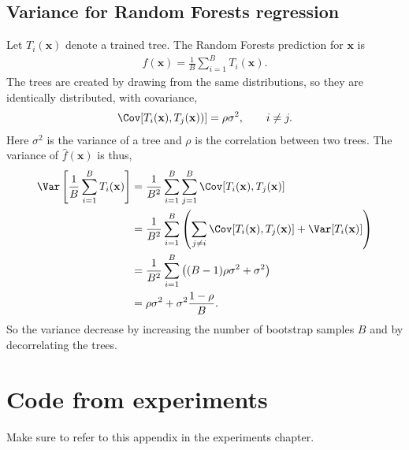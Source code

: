 \section{Variance for Random Forests regression}
\label{sec:Variance for Random Forests regression}
Let $T_i(\mathbf{x})$ denote a trained tree. The Random Forests prediction for $\mathbf{x}$ is 
\begin{align}
  \hat f(\mathbf{x}) = \frac{1}{B} \sum_{i = 1}^{B} T_i(\mathbf{x}).
\end{align}
The trees are created by drawing from the same distributions, so they are identically distributed, with covariance,
\begin{align}
  \Cov[T_i(\mathbf{x}), T_j(\mathbf{x}))] = \rho \sigma^2, \quad \quad i \neq j.
\end{align}
Here $\sigma^2$ is the variance of a tree and $\rho$ is the correlation between two trees.  
The variance of $\hat f(\mathbf{x})$ is thus,
\begin{align}
\Var\left[ \frac{1}{B} \sum_{i = 1}^{B} T_i(\mathbf{x}) \right] 
&= \frac{1}{B^2} \sum_{i =1}^B \sum_{j= 1}^B \Cov[T_i(\mathbf{x}), T_j(\mathbf{x})] \notag \\
&= \frac{1}{B^2} \sum_{i =1}^B \left(\sum_{j \neq i} \Cov[T_i(\mathbf{x}), T_j(\mathbf{x})] + \Var[T_i(\mathbf{x})]  \right)\notag \\
&= \frac{1}{B^2} \sum_{i =1}^B \left( (B-1) \rho \sigma^2 + \sigma^2  \right)\notag \\
&= \rho \sigma^2 + \sigma^2 \frac{1-\rho}{B}.
\end{align}
So the variance decrease by increasing the number of bootstrap samples $B$ and by decorrelating the trees.

\chapter{Code from experiments}
\label{chap:Code}
Make sure to refer to this appendix in the experiments chapter.
